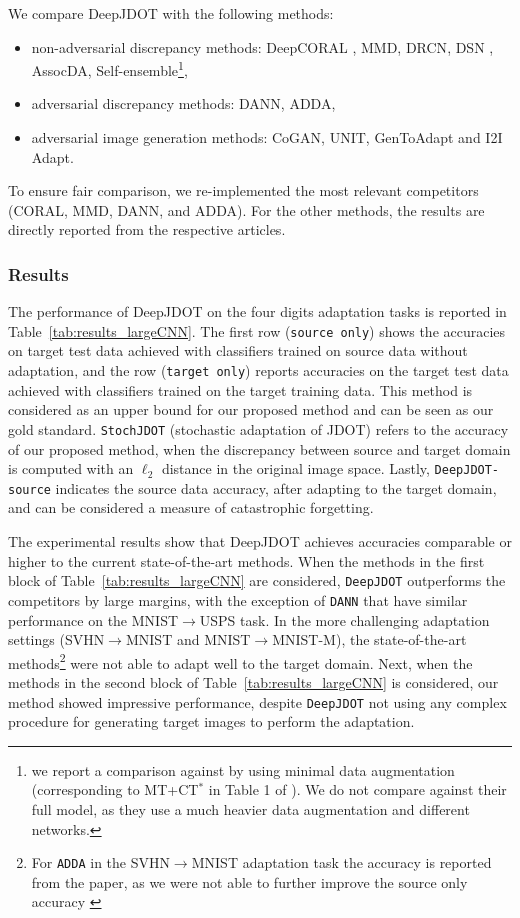 \documentclass[runningheads]{llncs}
\begin{document}
We compare DeepJDOT with the following methods: 
\begin{itemize}
\item non-adversarial discrepancy methods: DeepCORAL \cite{deepcoral}, MMD\cite{LongMMD}, DRCN\cite{DRCN}, DSN \cite{DSN}, AssocDA\cite{AssocDA}, Self-ensemble\cite{french2018}{\footnote{we report a comparison against \cite{french2018} by using minimal data augmentation (corresponding to MT+CT$^*$ in
Table 1 of \cite{french2018}). We do not compare against their full model, as they use a much heavier data augmentation and different networks.\label{ft:self-ensemble}}}, 
\item adversarial discrepancy methods: DANN\cite{Ganin2016}, ADDA\cite{Adda}, 
\item adversarial image generation methods: CoGAN\cite{CoGAN}, UNIT\cite{UNIT},  GenToAdapt\cite{GenToAdapt} and I2I Adapt\cite{I2IAdapt}. 
\end{itemize}
To ensure fair comparison, we re-implemented the most relevant competitors (CORAL, MMD, DANN, and ADDA). For the other methods, the results are directly reported from the respective articles.


\subsubsection*{Results} The performance of DeepJDOT on the four digits adaptation tasks is reported in Table~\ref{tab:results_largeCNN}. The first row (\texttt{source only}) shows the accuracies on target test data achieved with classifiers trained on source data without adaptation, and the row (\texttt{target only}) reports accuracies on the target test data achieved with classifiers trained on the target training data. This  method is considered as an upper bound for our proposed method and can be seen as our gold standard. \texttt{StochJDOT} (stochastic adaptation of JDOT) refers to the accuracy of our proposed method, when the discrepancy between source and target domain is computed with an $\ell_2$ distance in the original image space. Lastly, \texttt{DeepJDOT-source} indicates the source data accuracy, after adapting to the target domain, and can be considered a measure of catastrophic forgetting.

The experimental results show that DeepJDOT achieves accuracies comparable or higher to the current state-of-the-art methods. When the methods in the first block of Table~\ref{tab:results_largeCNN} are considered, \texttt{DeepJDOT} outperforms the competitors by large margins, with the exception of \texttt{DANN} that have similar performance on the MNIST$\rightarrow$USPS task. In the more challenging adaptation settings (SVHN$\rightarrow$MNIST and MNIST$\rightarrow$MNIST-M),
the state-of-the-art methods{\footnote{For \texttt{ADDA}\cite{Adda} in the SVHN$\rightarrow$MNIST adaptation task the accuracy is reported from the paper, as we were not able to further improve the source only accuracy \label{ft:adda}}}
 were not able to adapt well to the target domain. Next, when the methods in the second block of Table~\ref{tab:results_largeCNN} is considered, our method showed impressive performance, despite \texttt{DeepJDOT} not using any complex procedure for generating target images to perform the adaptation. 
\end{document}
